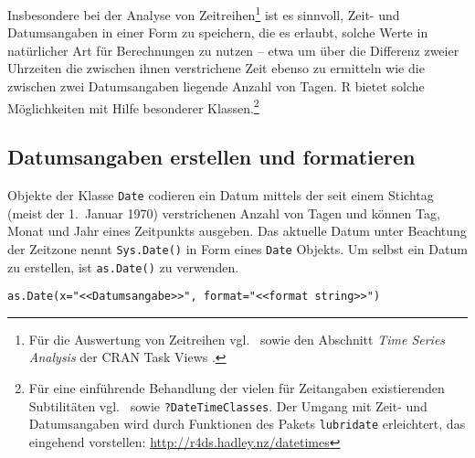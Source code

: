 Insbesondere bei der Analyse von Zeitreihen\footnote{Für die Auswertung von Zeitreihen vgl.\  sowie den Abschnitt \emph{Time Series Analysis} der CRAN Task Views \cite{CRANtvTimeSeries}.} ist es sinnvoll, Zeit- und Datumsangaben in einer Form zu speichern, die es erlaubt, solche Werte in natürlicher Art für Berechnungen zu nutzen -- etwa um über die Differenz zweier Uhrzeiten die zwischen ihnen verstrichene Zeit ebenso zu ermitteln wie die zwischen zwei Datumsangaben liegende Anzahl von Tagen. R bietet solche Möglichkeiten mit Hilfe besonderer Klassen.\footnote{Für eine einführende Behandlung der vielen für Zeitangaben existierenden Subtilitäten vgl.\  sowie \lstinline!?DateTimeClasses!. Der Umgang mit Zeit- und Datumsangaben wird durch Funktionen des Pakets \lstinline!lubridate! \cite{Grolemund2011} erleichtert, das  eingehend vorstellen: \url{http://r4ds.hadley.nz/datetimes}}

\subsection{Datumsangaben erstellen und formatieren}
\label{sec:dateFormat}

Objekte der Klasse \lstinline!Date! codieren ein Datum mittels der seit einem Stichtag (meist der 1.\ Januar 1970) verstrichenen Anzahl von Tagen und können Tag, Monat und Jahr eines Zeitpunkts ausgeben. Das aktuelle Datum unter Beachtung der Zeitzone nennt \lstinline!Sys.Date()! in Form eines \lstinline!Date! Objekts. Um selbst ein Datum zu erstellen, ist \lstinline!as.Date()! zu verwenden.
\begin{lstlisting}
as.Date(x="<<Datumsangabe>>", format="<<format string>>")
\end{lstlisting}

